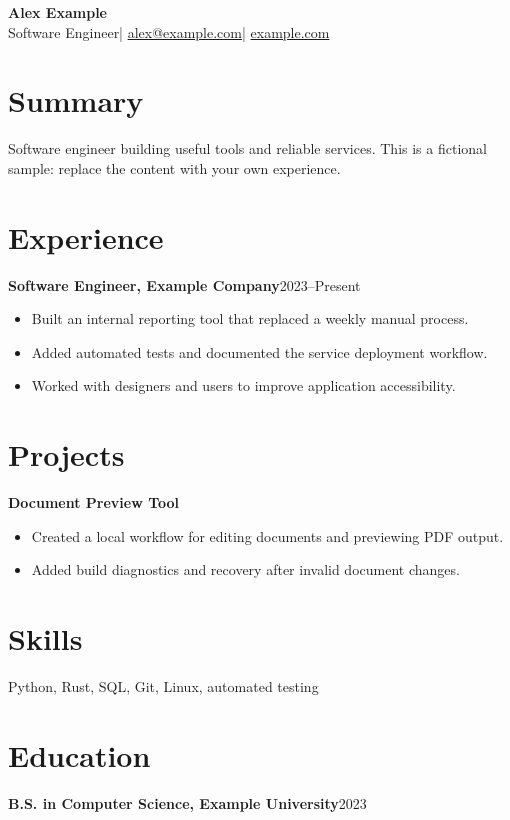 \documentclass[11pt,letterpaper]{article}
\begin{document}
{\LARGE\bfseries Alex Example}\\[4pt]
Software Engineer\quad |\quad
\href{mailto:alex@example.com}{alex@example.com}\quad |\quad
\href{https://example.com}{example.com}

\section*{Summary}
Software engineer building useful tools and reliable services.
This is a fictional sample: replace the content with your own experience.

\section*{Experience}
\textbf{Software Engineer, Example Company}\hfill 2023--Present
\begin{itemize}
  \item Built an internal reporting tool that replaced a weekly manual process.
  \item Added automated tests and documented the service deployment workflow.
  \item Worked with designers and users to improve application accessibility.
\end{itemize}

\section*{Projects}
\textbf{Document Preview Tool}
\begin{itemize}
  \item Created a local workflow for editing documents and previewing PDF output.
  \item Added build diagnostics and recovery after invalid document changes.
\end{itemize}

\section*{Skills}
Python, Rust, SQL, Git, Linux, automated testing

\section*{Education}
\textbf{B.S. in Computer Science, Example University}\hfill 2023
\end{document}
